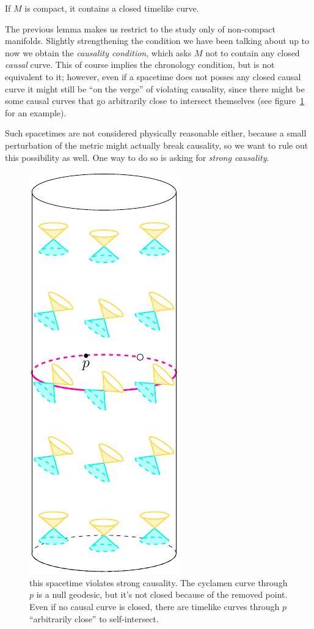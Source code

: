 \begin{lemma}
	If \(M\) is compact, it contains a closed timelike curve.
\end{lemma}
The previous lemma makes us restrict to the study only of non-compact manifolds.
Slightly strengthening the condition we have been talking about up to now we obtain the \emph{causality condition}, which asks \(M\) not to contain any closed \emph{causal} curve. This of course implies the chronology condition, but is not equivalent to it; however, even if a spacetime does not posses any closed causal curve it might still be ``on the verge'' of violating causality, since there might be some causal curves that go arbitrarily close to intersect themselves (see figure~\ref{fig:strong-causality} for an example).

Such spacetimes are not considered physically reasonable either, because a small perturbation of the metric might actually break causality, so we want to rule out this possibility as well. One way to do so is asking for \emph{strong causality}.
\begin{figure}
	\centering
	\includegraphics[scale=1.1]{Immagini/strong-causality/strong-causality.pdf}
	\caption[]{this spacetime violates strong causality. The cyclamen curve through \(p\) is a null geodesic, but it's not closed because of the removed point. Even if no causal curve is closed, there are timelike curves through \(p\) ``arbitrarily close'' to self-intersect.}
	\label{fig:strong-causality}
\end{figure}
